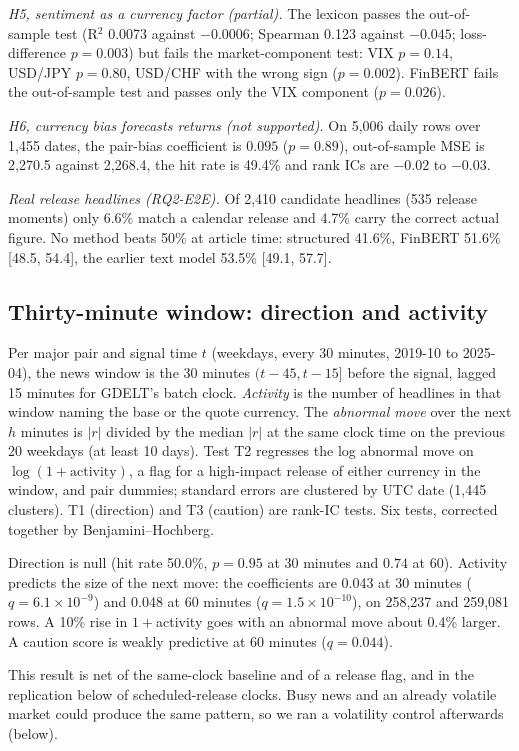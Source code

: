 \documentclass[conference]{IEEEtran}
\begin{document}
\emph{H5, sentiment as a currency factor (partial).} The lexicon passes the out-of-sample test
(R$^2$ 0.0073 against $-0.0006$; Spearman 0.123 against $-0.045$; loss-difference $p=0.003$) but
fails the market-component test: VIX $p=0.14$, USD/JPY $p=0.80$, USD/CHF with the wrong sign
($p=0.002$). FinBERT fails the out-of-sample test and passes only the VIX component
($p=0.026$).

\emph{H6, currency bias forecasts returns (not supported).} On 5,006 daily rows over 1,455 dates,
the pair-bias coefficient is $0.095$ ($p=0.89$), out-of-sample MSE is 2,270.5 against 2,268.4,
the hit rate is 49.4\% and rank ICs are $-0.02$ to $-0.03$.

\emph{Real release headlines (RQ2-E2E).} Of 2,410 candidate headlines (535 release moments) only
6.6\% match a calendar release and 4.7\% carry the correct actual figure. No method beats 50\% at
article time: structured 41.6\%, FinBERT 51.6\% [48.5, 54.4], the earlier text model 53.5\%
[49.1, 57.7].

\subsection{Thirty-minute window: direction and activity}
Per major pair and signal time $t$ (weekdays, every 30 minutes, 2019-10 to 2025-04), the news
window is the 30 minutes $(t-45,t-15]$ before the signal, lagged 15 minutes for GDELT's batch
clock. \emph{Activity} is the number of headlines in that window naming the base or the quote
currency. The \emph{abnormal move} over the next $h$ minutes is $|r|$ divided by the median $|r|$
at the same clock time on the previous 20 weekdays (at least 10 days). Test T2 regresses the log
abnormal move on $\log(1+\text{activity})$, a flag for a high-impact release of either currency in
the window, and pair dummies; standard errors are clustered by UTC date (1,445 clusters). T1
(direction) and T3 (caution) are rank-IC tests. Six tests, corrected together by Benjamini--Hochberg.

Direction is null (hit rate 50.0\%, $p=0.95$ at 30 minutes and $0.74$ at 60). Activity predicts
the size of the next move: the coefficients are 0.043 at 30 minutes ($q=6.1\times10^{-9}$) and
0.048 at 60 minutes ($q=1.5\times10^{-10}$), on 258,237 and 259,081 rows. A 10\% rise in
$1+$activity goes with an abnormal move about 0.4\% larger. A caution score is weakly predictive
at 60 minutes ($q=0.044$).

This result is net of the same-clock baseline and of a release flag, and in the replication below
of scheduled-release clocks. Busy news and an already volatile market could produce the same
pattern, so we ran a volatility control afterwards (below).
\end{document}
